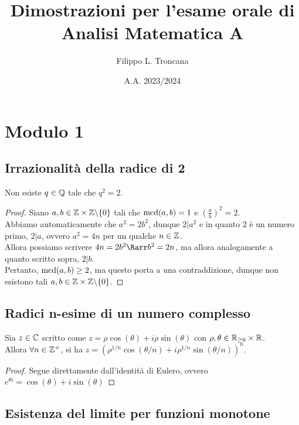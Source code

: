 \documentclass{article}
\title{Dimostrazioni per l'esame orale di Analisi Matematica A}
\author{Filippo L. Troncana}
\date{A.A. 2023/2024}
\begin{document}
\maketitle
\tableofcontents


\section{Modulo 1}

\subsection{Irrazionalità della radice di 2}

\begin{theorem}{}{}
    Non esiste $q \in \mathbb{Q}$ tale che $q^2=2$.
\end{theorem}
\begin{proof}
    Siano $a,b \in \mathbb{Z}\times \mathbb{Z} \backslash \{0\}$ tali che $\operatorname{mcd} (a,b)= 1$ e $\left(\frac{a}{b}\right)^2 = 2$.\\
    Abbiamo automaticamente che $a^2 = 2b^2$, dunque $2|a^2$ e in quanto $2$ è un numero primo, $2|a$, ovvero $a^2 = 4n$ per un qualche $n \in \mathbb{Z}$.\\
    Allora possiamo scrivere $4n = 2b^2 \Rarr b^2 = 2n$, ma allora analogamente a quanto scritto sopra, $2|b$.\\
    Pertanto, $\operatorname{mcd}(a,b)\ge 2$, ma questo porta a una contraddizione, dunque non esistono tali $a,b \in \mathbb{Z}\times\mathbb{Z}\backslash\{0\}$.
\end{proof}

\subsection{Radici n-esime di un numero complesso}

\begin{theorem}{}{}
    Sia $z \in \mathbb{C}$ scritto come $z = \rho\cos(\theta) + i\rho\sin(\theta)$ con $\rho, \theta \in \mathbb{R}_{\ge 0}\times \mathbb{R}$.\\
    Allora $\forall n \in \mathbb{Z}^+$, si ha $z = (\rho^{1/n} \cos(\theta/n) +i\rho^{1/n} \sin(\theta/n) )^n$.
\end{theorem}
\begin{proof}
    Segue direttamente dall'identità di Eulero, ovvero $e^{\theta i} = \cos(\theta) + i\sin(\theta)$
\end{proof}

\subsection{Esistenza del limite per funzioni monotone}
\end{document}
